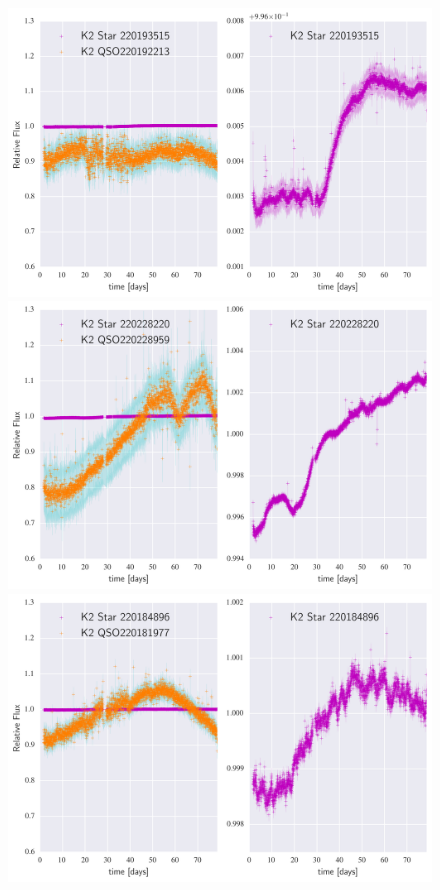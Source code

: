 \documentclass[a4paper,fleqn,usenatbib]{mnras}
\begin{document}
        	
         	\begin{figure}
 	\includegraphics[width=\columnwidth]{220192213NearestNeighbor.png}
 	\includegraphics[width=\columnwidth]{220228959NearestNeighbor.png}
 	\includegraphics[width=\columnwidth]{220181977NearestNeighbor.png}
         		\caption{}
         		\label{fig:example_figure}
         	\end{figure}          	
\end{document}
